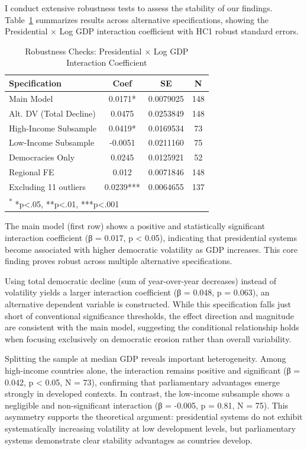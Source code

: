 \documentclass[
  letterpaper,
  DIV=11,
  numbers=noendperiod]{scrartcl}
\begin{document}
I conduct extensive robustness tests to assess the stability of our
findings. Table~\ref{tbl-robust} summarizes results across alternative
specifications, showing the Presidential \(\times\) Log GDP interaction
coefficient with HC1 robust standard errors.

\begin{longtable}[t]{lccc}

\caption{\label{tbl-robust}Robustness Checks: Presidential \(\times\)
Log GDP Interaction Coefficient}

\tabularnewline

\toprule
Specification & Coef & SE & N\\
\midrule
Main Model & 0.0171* & 0.0079025 & 148\\
Alt. DV (Total Decline) & 0.0475 & 0.0253849 & 148\\
High-Income Subsample & 0.0419* & 0.0169534 & 73\\
Low-Income Subsample & -0.0051 & 0.0211160 & 75\\
Democracies Only & 0.0245 & 0.0125921 & 52\\
\addlinespace
Regional FE & 0.012 & 0.0071846 & 148\\
Excluding 11 outliers & 0.0239*** & 0.0064655 & 137\\
\bottomrule
\multicolumn{4}{l}{\rule{0pt}{1em}\textsuperscript{*} *p<.05, **p<.01, ***p<.001}\\

\end{longtable}

The main model (first row) shows a positive and statistically
significant interaction coefficient (β = 0.017, p \textless{} 0.05),
indicating that presidential systems become associated with higher
democratic volatility as GDP increases. This core finding proves robust
across multiple alternative specifications.

Using total democratic decline (sum of year-over-year decreases) instead
of volatility yields a larger interaction coefficient (β = 0.048, p =
0.063), an alternative dependent variable is constructed. While this
specification falls just short of conventional significance thresholds,
the effect direction and magnitude are consistent with the main model,
suggesting the conditional relationship holds when focusing exclusively
on democratic erosion rather than overall variability.

Splitting the sample at median GDP reveals important heterogeneity.
Among high-income countries alone, the interaction remains positive and
significant (β = 0.042, p \textless{} 0.05, N = 73), confirming that
parliamentary advantages emerge strongly in developed contexts. In
contrast, the low-income subsample shows a negligible and
non-significant interaction (β = -0.005, p = 0.81, N = 75). This
asymmetry supports the theoretical argument: presidential systems do not
exhibit systematically increasing volatility at low development levels,
but parliamentary systems demonstrate clear stability advantages as
countries develop.
\end{document}
